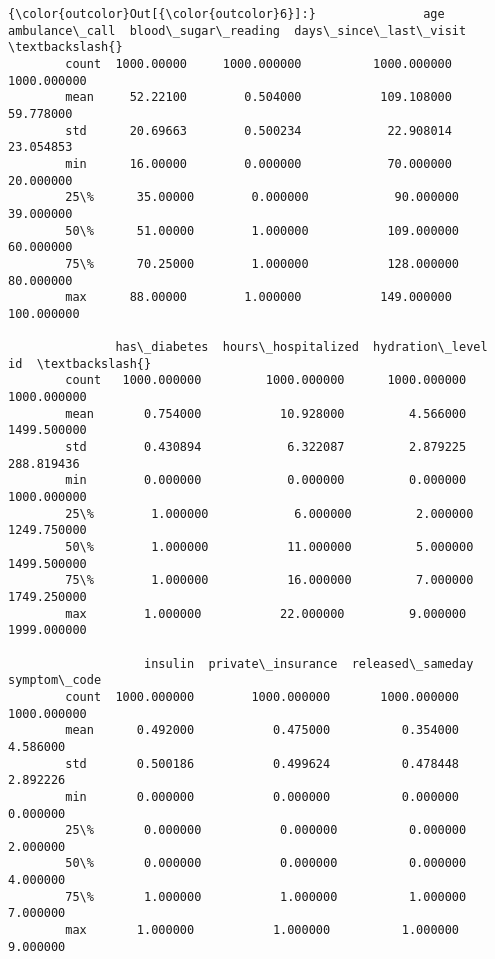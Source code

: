 \documentclass[11pt]{article}
\begin{document}
\begin{Verbatim}[commandchars=\\\{\}]
{\color{outcolor}Out[{\color{outcolor}6}]:}               age  ambulance\_call  blood\_sugar\_reading  days\_since\_last\_visit  \textbackslash{}
        count  1000.00000     1000.000000          1000.000000            1000.000000   
        mean     52.22100        0.504000           109.108000              59.778000   
        std      20.69663        0.500234            22.908014              23.054853   
        min      16.00000        0.000000            70.000000              20.000000   
        25\%      35.00000        0.000000            90.000000              39.000000   
        50\%      51.00000        1.000000           109.000000              60.000000   
        75\%      70.25000        1.000000           128.000000              80.000000   
        max      88.00000        1.000000           149.000000             100.000000   
        
               has\_diabetes  hours\_hospitalized  hydration\_level           id  \textbackslash{}
        count   1000.000000         1000.000000      1000.000000  1000.000000   
        mean       0.754000           10.928000         4.566000  1499.500000   
        std        0.430894            6.322087         2.879225   288.819436   
        min        0.000000            0.000000         0.000000  1000.000000   
        25\%        1.000000            6.000000         2.000000  1249.750000   
        50\%        1.000000           11.000000         5.000000  1499.500000   
        75\%        1.000000           16.000000         7.000000  1749.250000   
        max        1.000000           22.000000         9.000000  1999.000000   
        
                   insulin  private\_insurance  released\_sameday  symptom\_code  
        count  1000.000000        1000.000000       1000.000000   1000.000000  
        mean      0.492000           0.475000          0.354000      4.586000  
        std       0.500186           0.499624          0.478448      2.892226  
        min       0.000000           0.000000          0.000000      0.000000  
        25\%       0.000000           0.000000          0.000000      2.000000  
        50\%       0.000000           0.000000          0.000000      4.000000  
        75\%       1.000000           1.000000          1.000000      7.000000  
        max       1.000000           1.000000          1.000000      9.000000  
\end{Verbatim}
            
\end{document}
